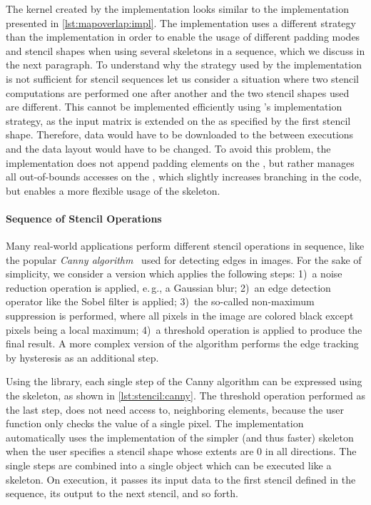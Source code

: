 The \OpenCL kernel created by the  implementation looks similar to the  implementation presented in \autoref{lst:mapoverlap:impl}.
The  implementation uses a different strategy than the  implementation in order to enable the usage of different padding modes and stencil shapes when using several \stencil skeletons in a sequence, which we discuss in the next paragraph.
To understand why the strategy used by the  implementation is not sufficient for stencil sequences let us consider a situation where two stencil computations are performed one after another and the two stencil shapes used are different.
This cannot be implemented efficiently using 's implementation strategy, as the input matrix is extended on the \CPU as specified by the first stencil shape.
Therefore, data would have to be downloaded to the \CPU between executions and the data layout would have to be changed.
To avoid this problem, the  implementation does not append padding elements on the \CPU, but rather manages all out-of-bounds accesses on the \GPU, which slightly increases branching in the code, but enables a more flexible usage of the skeleton.


\paragraph{Sequence of Stencil Operations}
Many real-world applications perform different stencil operations in sequence, like the popular \emph{Canny algorithm}~\cite{NixonAg2012} used for detecting edges in images.
For the sake of simplicity, we consider a version which applies the following steps:
1)~a noise reduction operation is applied, e.\,g., a Gaussian blur;
2)~an edge detection operator like the Sobel filter is applied;
3)~the so-called non-maximum suppression is performed, where all pixels in the image are colored black except pixels being a local maximum;
4)~a threshold operation is applied to produce the final result.
A more complex version of the algorithm performs the edge tracking by hysteresis as an additional step.

Using the \SkelCL library, each single step of the Canny algorithm can be expressed using the \stencil skeleton, as shown in \autoref{lst:stencil:canny}.
The threshold operation performed as the last step, does not need access to, neighboring elements, because the user function only checks the value of a single pixel.
The  implementation automatically uses the implementation of the simpler (and thus faster) \map skeleton when the user specifies a stencil shape whose extents are $0$ in all directions.
The single steps are combined into a single object  which can be executed like a \stencil skeleton.
On execution, it passes its input data to the first stencil defined in the sequence, its output to the next stencil, and so forth.

